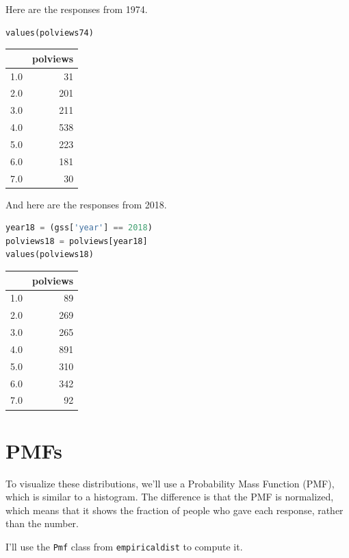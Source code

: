Here are the responses from 1974.

\begin{lstlisting}[language=Python]
values(polviews74)
\end{lstlisting}

\begin{tabular}{lr}
\toprule
{} &  polviews \\
\midrule
1.0 &        31 \\
2.0 &       201 \\
3.0 &       211 \\
4.0 &       538 \\
5.0 &       223 \\
6.0 &       181 \\
7.0 &        30 \\
\bottomrule
\end{tabular}

And here are the responses from 2018.

\begin{lstlisting}[language=Python]
year18 = (gss['year'] == 2018)
polviews18 = polviews[year18]
values(polviews18)
\end{lstlisting}

\begin{tabular}{lr}
\toprule
{} &  polviews \\
\midrule
1.0 &        89 \\
2.0 &       269 \\
3.0 &       265 \\
4.0 &       891 \\
5.0 &       310 \\
6.0 &       342 \\
7.0 &        92 \\
\bottomrule
\end{tabular}

\hypertarget{pmfs}{%
\section{PMFs}\label{pmfs}}

To visualize these distributions, we'll use a Probability Mass Function
(PMF), which is similar to a histogram. The difference is that the PMF
is normalized, which means that it shows the fraction of people who gave
each response, rather than the number.

I'll use the \passthrough{\lstinline!Pmf!} class from
\passthrough{\lstinline!empiricaldist!} to compute it.

